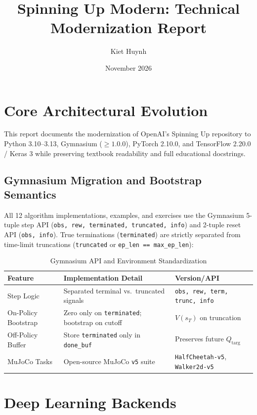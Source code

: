\documentclass{article}
\title{Spinning Up Modern: Technical Modernization Report}
\author{Kiet Huynh}
\date{November 2026}
\begin{document}
\maketitle

\section{Core Architectural Evolution}
This report documents the modernization of OpenAI's Spinning Up repository to Python 3.10--3.13, Gymnasium ($\ge 1.0.0$), PyTorch 2.10.0, and TensorFlow 2.20.0 / Keras 3 while preserving textbook readability and full educational docstrings.

\subsection{Gymnasium Migration and Bootstrap Semantics}
All 12 algorithm implementations, examples, and exercises use the Gymnasium 5-tuple step API (\texttt{obs, rew, terminated, truncated, info}) and 2-tuple reset API (\texttt{obs, info}). True terminations (\texttt{terminated}) are strictly separated from time-limit truncations (\texttt{truncated} or \texttt{ep\_len == max\_ep\_len}):
\begin{table}[h]
\centering
\caption{Gymnasium API and Environment Standardization}
\begin{tabular}{@{}lll@{}}
\toprule
Feature & Implementation Detail & Version/API \\ \midrule
Step Logic & Separated terminal vs.\ truncated signals & \texttt{obs, rew, term, trunc, info} \\
On-Policy Bootstrap & Zero only on \texttt{terminated}; bootstrap on cutoff & $V(s_T)$ on truncation \\
Off-Policy Buffer & Store \texttt{terminated} only in \texttt{done\_buf} & Preserves future $Q_{\text{targ}}$ \\
MuJoCo Tasks & Open-source MuJoCo \texttt{v5} suite & \texttt{HalfCheetah-v5}, \texttt{Walker2d-v5} \\ \bottomrule
\end{tabular}
\end{table}

\section{Deep Learning Backends}
\end{document}

